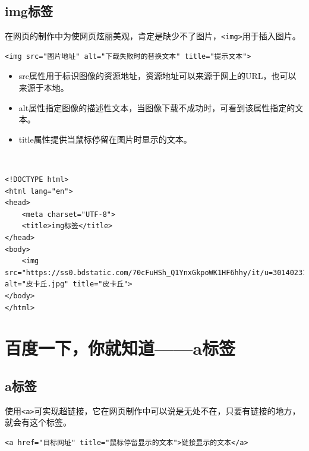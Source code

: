 \subsection{img标签}

在网页的制作中为使网页炫丽美观，肯定是缺少不了图片，\lstinline|<img>|用于插入图片。 \\

\begin{lstlisting}[style=htmlcssjs]
<img src="图片地址" alt="下载失败时的替换文本" title="提示文本">
\end{lstlisting}

\begin{itemize}
    \item src属性用于标识图像的资源地址，资源地址可以来源于网上的URL，也可以来源于本地。

    \item alt属性指定图像的描述性文本，当图像下载不成功时，可看到该属性指定的文本。

    \item title属性提供当鼠标停留在图片时显示的文本。
\end{itemize}

 \\
\begin{lstlisting}[style=htmlcssjs, breaklines=true, breakatwhitespace=false]
<!DOCTYPE html>
<html lang="en">
<head>
    <meta charset="UTF-8">
    <title>img标签</title>
</head>
<body>
    <img src="https://ss0.bdstatic.com/70cFuHSh_Q1YnxGkpoWK1HF6hhy/it/u=3014023147,616635741&fm=26&gp=0.jpg" alt="皮卡丘.jpg" title="皮卡丘">
</body>
</html>
\end{lstlisting}

\newpage

\section{百度一下，你就知道——a标签}

\subsection{a标签}

使用\lstinline|<a>|可实现超链接，它在网页制作中可以说是无处不在，只要有链接的地方，就会有这个标签。 \\

\begin{lstlisting}[style=htmlcssjs]
<a href="目标网址" title="鼠标停留显示的文本">链接显示的文本</a>
\end{lstlisting}


